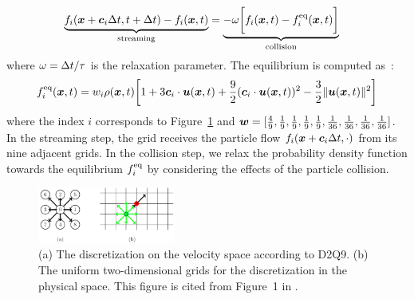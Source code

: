 \begin{equation}
\begin{aligned}
  \underbrace{f_i(\boldsymbol{x} + \boldsymbol{c}_i\Delta t , t + \Delta t) - f_i(\boldsymbol{x}, t)}_{
    \text{streaming}
  } &= 
  \underbrace{- \omega 
  \biggl[
    f_i(\boldsymbol{x}, t) -
    f^{\rm eq}_i(\boldsymbol{x}, t)
  \biggl]}_{
    \text{collision}
  }
\end{aligned}
\label{discretized-streaming}
\end{equation}
where $\omega = \Delta t / \tau$ is the relaxation parameter.
The equilibrium is computed as~\cite{zhao2002non}:
\begin{equation}
\begin{aligned}
  f^{\rm eq}_i(\boldsymbol{x}, t) &=
  w_i \rho(\boldsymbol{x}, t) \biggl[
    1 + 3 \boldsymbol{c}_i \cdot \boldsymbol{u}(\boldsymbol{x}, t) +
    \frac{9}{2}(\boldsymbol{c}_i \cdot \boldsymbol{u}(\boldsymbol{x}, t))^2
    -\frac{3}{2} \| \boldsymbol{u}(\boldsymbol{x}, t) \|^2
  \biggr] \\
\end{aligned}
\label{discretized-eq}
\end{equation}
where the index $i$ corresponds to Figure~\ref{fig:d2q9}
and $\boldsymbol{w} = [\frac{4}{9}, \frac{1}{9}, \frac{1}{9}, \frac{1}{9}, \frac{1}{9}, \frac{1}{36}, \frac{1}{36}, \frac{1}{36}, \frac{1}{36}]$.
In the streaming step, the grid receives 
the particle flow $f_i(\boldsymbol{x} + \boldsymbol{c}_i \Delta t, \cdot)$
from its nine adjacent grids.
In the collision step,
we relax the probability density function 
towards the equilibrium $f_i^{\rm eq}$
by considering the effects of the particle collision.

\begin{figure}[h!]
  \begin{center}
   \includegraphics[width=0.4\textwidth]{logos/Gitter_LBM.png}
   \vspace{-3mm}
   \caption{
      (a) The discretization on the velocity space according to D2Q9.
      (b) The uniform two-dimensional grids for
      the discretization in the physical space.
      This figure is cited from Figure~1 in \cite{pastewka2019hpc}.
   }
  \label{fig:d2q9}
  \end{center}
  \vspace{-10mm}
\end{figure}

